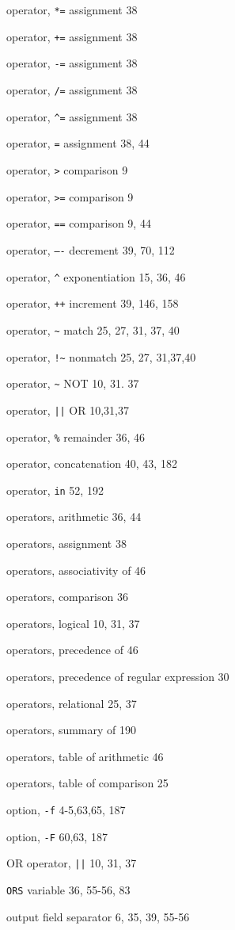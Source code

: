 \begin{multicols}{2}
operator, \verb'*=' assignment 38

operator, \verb'+=' assignment 38

operator, \verb'-=' assignment 38

operator, \verb'/=' assignment 38

operator, \verb'^=' assignment 38

operator, \verb'=' assignment 38, 44

operator, \verb'>' comparison 9

operator, \verb'>=' comparison 9

operator, \verb'==' comparison 9, 44

operator, \verb'—-' decrement 39, 70, 112

operator, \verb'^' exponentiation 15, 36, 46

operator, \verb'++' increment 39, 146, 158

operator, \verb'~' match 25, 27, 31, 37, 40

operator, \verb'!~' nonmatch 25, 27, 31,37,40

operator, \verb'~' NOT 10, 31. 37

operator, \verb'||' OR 10,31,37

operator, \verb'%' remainder 36, 46

operator, concatenation 40, 43,  182

operator, \verb'in' 52, 192

operators, arithmetic 36, 44

operators, assignment 38

operators, associativity of 46

operators, comparison 36

operators, logical 10, 31, 37

operators, precedence of 46

operators, precedence of regular expression 30

operators, relational 25, 37

operators, summary of 190

operators, table of arithmetic 46

operators, table of comparison 25

option, \verb'-f' 4-5,63,65, 187

option, \verb'-F' 60,63, 187

OR operator, \verb'||' 10, 31, 37

\verb'ORS' variable 36, 55-56, 83

output field separator 6, 35, 39, 55-56


\end{multicols}
